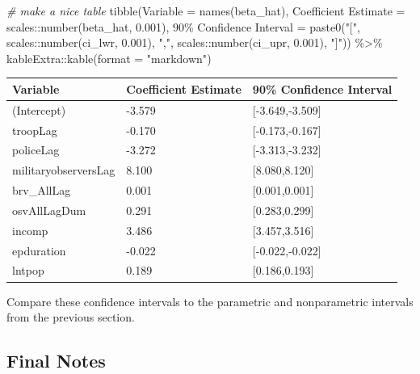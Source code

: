 \documentclass[
]{book}
\newenvironment{Shaded}{\begin{snugshade}}{\end{snugshade}}
\newcommand{\AttributeTok}[1]{\textcolor[rgb]{0.77,0.63,0.00}{#1}}
\newcommand{\CommentTok}[1]{\textcolor[rgb]{0.56,0.35,0.01}{\textit{#1}}}
\newcommand{\FloatTok}[1]{\textcolor[rgb]{0.00,0.00,0.81}{#1}}
\newcommand{\FunctionTok}[1]{\textcolor[rgb]{0.00,0.00,0.00}{#1}}
\newcommand{\NormalTok}[1]{#1}
\newcommand{\OtherTok}[1]{\textcolor[rgb]{0.56,0.35,0.01}{#1}}
\newcommand{\SpecialCharTok}[1]{\textcolor[rgb]{0.00,0.00,0.00}{#1}}
\newcommand{\StringTok}[1]{\textcolor[rgb]{0.31,0.60,0.02}{#1}}
\begin{document}
\begin{Shaded}
\begin{Highlighting}[]
\CommentTok{\# make a nice table}
\FunctionTok{tibble}\NormalTok{(}\StringTok{\textasciigrave{}}\AttributeTok{Variable}\StringTok{\textasciigrave{}} \OtherTok{=} \FunctionTok{names}\NormalTok{(beta\_hat),}
       \StringTok{\textasciigrave{}}\AttributeTok{Coefficient Estimate}\StringTok{\textasciigrave{}} \OtherTok{=}\NormalTok{ scales}\SpecialCharTok{::}\FunctionTok{number}\NormalTok{(beta\_hat, }\FloatTok{0.001}\NormalTok{),}
       \StringTok{\textasciigrave{}}\AttributeTok{90\% Confidence Interval}\StringTok{\textasciigrave{}} \OtherTok{=} \FunctionTok{paste0}\NormalTok{(}\StringTok{"["}\NormalTok{, scales}\SpecialCharTok{::}\FunctionTok{number}\NormalTok{(ci\_lwr, }\FloatTok{0.001}\NormalTok{), }\StringTok{","}\NormalTok{, scales}\SpecialCharTok{::}\FunctionTok{number}\NormalTok{(ci\_upr, }\FloatTok{0.001}\NormalTok{), }\StringTok{"]"}\NormalTok{)) }\SpecialCharTok{\%\textgreater{}\%}
\NormalTok{  kableExtra}\SpecialCharTok{::}\FunctionTok{kable}\NormalTok{(}\AttributeTok{format =} \StringTok{"markdown"}\NormalTok{)}
\end{Highlighting}
\end{Shaded}

\begin{longtable}[]{@{}lll@{}}
\toprule
Variable & Coefficient Estimate & 90\% Confidence Interval \\
\midrule
\endhead
(Intercept) & -3.579 & {[}-3.649,-3.509{]} \\
troopLag & -0.170 & {[}-0.173,-0.167{]} \\
policeLag & -3.272 & {[}-3.313,-3.232{]} \\
militaryobserversLag & 8.100 & {[}8.080,8.120{]} \\
brv\_AllLag & 0.001 & {[}0.001,0.001{]} \\
osvAllLagDum & 0.291 & {[}0.283,0.299{]} \\
incomp & 3.486 & {[}3.457,3.516{]} \\
epduration & -0.022 & {[}-0.022,-0.022{]} \\
lntpop & 0.189 & {[}0.186,0.193{]} \\
\bottomrule
\end{longtable}

Compare these confidence intervals to the parametric and nonparametric
intervals from the previous section.

\hypertarget{final-notes}{%
\subsection{Final Notes}\label{final-notes}}
\end{document}
